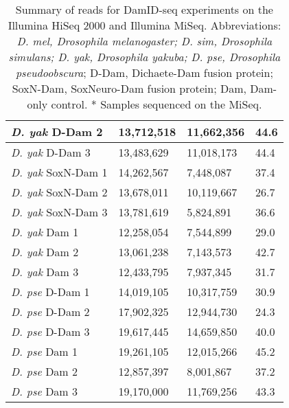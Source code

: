 \begin{table}[!h]
\begin{tabular}{|l|l|l|l|}
\emph{D. yak} D-Dam 2     & 13,712,518  & 11,662,356   & 44.6               \\ \hline
\emph{D. yak} D-Dam 3     & 13,483,629  & 11,018,173   & 44.4               \\ \hline
\emph{D. yak} SoxN-Dam 1  & 14,262,567  & 7,448,087    & 37.4               \\ \hline
\emph{D. yak} SoxN-Dam 2  & 13,678,011  & 10,119,667   & 26.7               \\ \hline
\emph{D. yak} SoxN-Dam 3  & 13,781,619  & 5,824,891    & 36.6               \\ \hline
\emph{D. yak} Dam 1       & 12,258,054  & 7,544,899    & 29.0                 \\ \hline
\emph{D. yak} Dam 2       & 13,061,238  & 7,143,573    & 42.7               \\ \hline
\emph{D. yak} Dam 3       & 12,433,795  & 7,937,345    & 31.7               \\ \hline
\emph{D. pse} D-Dam 1     & 14,019,105  & 10,317,759   & 30.9               \\ \hline
\emph{D. pse} D-Dam 2     & 17,902,325  & 12,944,730   & 24.3               \\ \hline
\emph{D. pse} D-Dam 3     & 19,617,445  & 14,659,850   & 40.0                 \\ \hline
\emph{D. pse} Dam 1       & 19,261,105  & 12,015,266   & 45.2               \\ \hline
\emph{D. pse} Dam 2       & 12,857,397  & 8,001,867    & 37.2               \\ \hline
\emph{D. pse} Dam 3       & 19,170,000  & 11,769,256   & 43.3               \\ \hline
\end{tabular}
\caption{Summary of reads for DamID-seq experiments on the Illumina HiSeq 2000 and Illumina MiSeq. Abbreviations: \emph{D. mel, Drosophila melanogaster; D. sim, Drosophila simulans; D. yak, Drosophila yakuba; D. pse, Drosophila pseudoobscura}; D-Dam, Dichaete-Dam fusion protein; SoxN-Dam, SoxNeuro-Dam fusion protein; Dam, Dam-only control. * Samples sequenced on the MiSeq.}
\label{Table 4.1}
\end{table}

